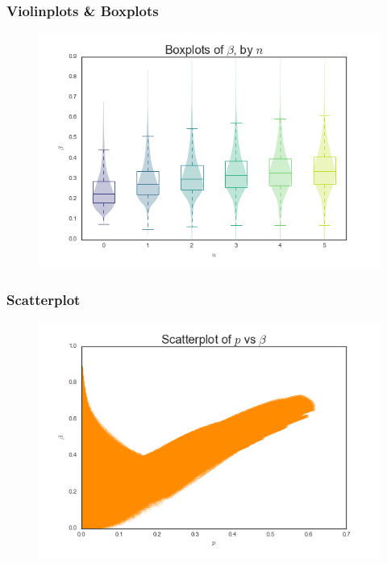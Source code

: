 \documentclass{beamer}
\begin{document}
\begin{frame}
\frametitle{Violinplots \& Boxplots}
\begin{figure}
	\includegraphics[width=\textwidth]{violins}
\end{figure}
\end{frame}

\begin{frame}
\frametitle{Scatterplot}
\begin{figure}
	\includegraphics[width=\textwidth]{scatter}
\end{figure}
\end{frame}
\end{document}
